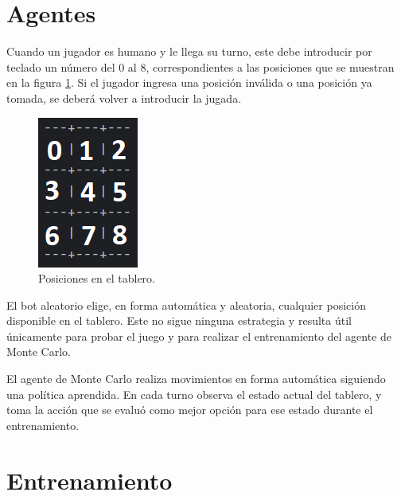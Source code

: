 \section{Agentes}

Cuando  un jugador es humano y le llega su turno, este debe introducir por teclado un número del 0 al 8, correspondientes a las posiciones que se muestran en la figura \ref{fig:human_board}. Si el jugador ingresa una posición inválida o una posición ya tomada, se deberá volver a introducir la jugada.

\begin{figure}[htbp]
	\centering
	\includegraphics[width=.25\textwidth]{./Figures/human_board.png}
	\caption{Posiciones en el tablero.}
	\label{fig:human_board}
\end{figure}

El bot aleatorio elige, en forma automática y aleatoria, cualquier posición disponible en el tablero. Este no sigue ninguna estrategia y resulta útil únicamente para probar el juego y para realizar el entrenamiento del agente de Monte Carlo.

El agente de Monte Carlo realiza movimientos en forma automática siguiendo una política aprendida. En cada turno observa el estado actual del tablero, y toma la acción que se evaluó como mejor opción para ese estado durante el entrenamiento.

\section{Entrenamiento}


